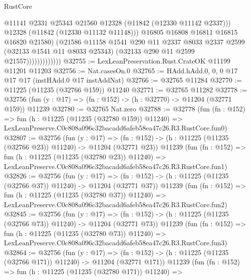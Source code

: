 \begin{lexlean}{RustCore}
\begin{coremodule}
                                @11141
                                @2331
                                @25343
                                @21560
                                @12328
                                (@11842 (@12330 @11142 @2337)))
                              @12328
                              (@11842 (@12330 @11132 @11148)))
                            @16805
                            @16808
                            @16811
                            @16815
                            @16820
                            @21580)
                          (@21586
                            @11158
                            @1541
                            @290
                            @11
                            @2337
                            @8033
                            @2337
                            @2599
                            (@32133 @1541 @11 @8033 @25343)
                            (@32133 @290 @11 @2599 @21557)))))))))))))
@32755 := LexLeanPreservation.Rust.CrateOK @11199 @11201 @11203
@32756 := Nat.casesOn.{0}
@32765 := HAdd.hAdd.{0, 0, 0} @17 @17 @17 (instHAdd.{0} @17 instAddNat)
@32766 := @32765 @11284
@32770 := @11225 (@11235 (@32766 @159)) @11240
@32771 := @32765 @11282
@32778 := @32756 (fun (y : @17) => (fn : @152) -> (h : @32770) -> @11204 (@32771 @159)) @11239
@32780 := @32765 Nat.zero
@32788 := @32778
    (fun (fn : @152) =>
    fun (h : @11225 (@11235 (@32780 @159)) @11240) =>
    LexLeanPreserve.C0c808a096c32bacadd6afeb58ea47c26.R3.RustCore.fun0)
@32807 := @32756
    (fun (y : @17) =>
    (fn : @152) -> (h : @11225 (@11235 (@32766 @23)) @11240) -> @11204 (@32771 @23))
    @11239
    (fun (fn : @152) =>
    fun (h : @11225 (@11235 (@32780 @23)) @11240) =>
    LexLeanPreserve.C0c808a096c32bacadd6afeb58ea47c26.R3.RustCore.fun1)
@32826 := @32756
    (fun (y : @17) =>
    (fn : @152) -> (h : @11225 (@11235 (@32766 @37)) @11240) -> @11204 (@32771 @37))
    @11239
    (fun (fn : @152) =>
    fun (h : @11225 (@11235 (@32780 @37)) @11240) =>
    LexLeanPreserve.C0c808a096c32bacadd6afeb58ea47c26.R3.RustCore.fun2)
@32845 := @32756
    (fun (y : @17) =>
    (fn : @152) -> (h : @11225 (@11235 (@32766 @73)) @11240) -> @11204 (@32771 @73))
    @11239
    (fun (fn : @152) =>
    fun (h : @11225 (@11235 (@32780 @73)) @11240) =>
    LexLeanPreserve.C0c808a096c32bacadd6afeb58ea47c26.R3.RustCore.fun3)
@32864 := @32756
    (fun (y : @17) =>
    (fn : @152) -> (h : @11225 (@11235 (@32766 @171)) @11240) -> @11204 (@32771 @171))
    @11239
    (fun (fn : @152) =>
    fun (h : @11225 (@11235 (@32780 @171)) @11240) =>

\end{coremodule}
\end{lexlean}
